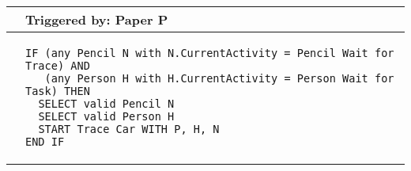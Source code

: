\begin{longtable}{@{}>{\raggedright\arraybackslash}p{0.25cm}>{\raggedright\arraybackslash}p{13cm}@{}}
  \toprule
   & Triggered by: Paper P\\ \midrule 
  &
\begin{lstlisting}[language=CMPseudo]
IF (any Pencil N with N.CurrentActivity = Pencil Wait for Trace) AND
   (any Person H with H.CurrentActivity = Person Wait for Task) THEN
  SELECT valid Pencil N
  SELECT valid Person H
  START Trace Car WITH P, H, N
END IF
\end{lstlisting}
  \\ \bottomrule
  \end{longtable}